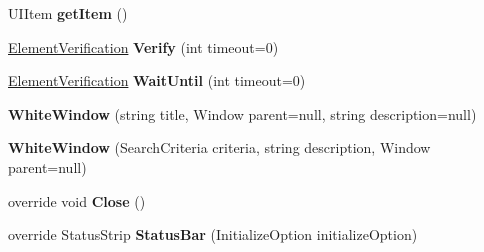 \begin{DoxyCompactItemize}
\item 
\hypertarget{class_proto_test_1_1_golem_1_1_white_1_1_elements_1_1_white_window_a6c56fbf53c3268df54c38743e98be267}{U\-I\-Item {\bfseries get\-Item} ()}\label{class_proto_test_1_1_golem_1_1_white_1_1_elements_1_1_white_window_a6c56fbf53c3268df54c38743e98be267}

\item 
\hypertarget{class_proto_test_1_1_golem_1_1_white_1_1_elements_1_1_white_window_a991aee8890ecb548549f3bc725857854}{\hyperlink{class_proto_test_1_1_golem_1_1_white_1_1_element_verification}{Element\-Verification} {\bfseries Verify} (int timeout=0)}\label{class_proto_test_1_1_golem_1_1_white_1_1_elements_1_1_white_window_a991aee8890ecb548549f3bc725857854}

\item 
\hypertarget{class_proto_test_1_1_golem_1_1_white_1_1_elements_1_1_white_window_a76a90cb735b1012a859a599ce86ca219}{\hyperlink{class_proto_test_1_1_golem_1_1_white_1_1_element_verification}{Element\-Verification} {\bfseries Wait\-Until} (int timeout=0)}\label{class_proto_test_1_1_golem_1_1_white_1_1_elements_1_1_white_window_a76a90cb735b1012a859a599ce86ca219}

\item 
\hypertarget{class_proto_test_1_1_golem_1_1_white_1_1_elements_1_1_white_window_aa6aaa3b841653942b2370c9cfd60b432}{{\bfseries White\-Window} (string title, Window parent=null, string description=null)}\label{class_proto_test_1_1_golem_1_1_white_1_1_elements_1_1_white_window_aa6aaa3b841653942b2370c9cfd60b432}

\item 
\hypertarget{class_proto_test_1_1_golem_1_1_white_1_1_elements_1_1_white_window_ae9b03f587db9d19146926dabe256836b}{{\bfseries White\-Window} (Search\-Criteria criteria, string description, Window parent=null)}\label{class_proto_test_1_1_golem_1_1_white_1_1_elements_1_1_white_window_ae9b03f587db9d19146926dabe256836b}

\item 
\hypertarget{class_proto_test_1_1_golem_1_1_white_1_1_elements_1_1_white_window_ab0fc2b2f5202e352b5e010a53bb63066}{override void {\bfseries Close} ()}\label{class_proto_test_1_1_golem_1_1_white_1_1_elements_1_1_white_window_ab0fc2b2f5202e352b5e010a53bb63066}

\item 
\hypertarget{class_proto_test_1_1_golem_1_1_white_1_1_elements_1_1_white_window_afaa8a43e70a4a1f98e0f6227bf59cdd2}{override Status\-Strip {\bfseries Status\-Bar} (Initialize\-Option initialize\-Option)}\label{class_proto_test_1_1_golem_1_1_white_1_1_elements_1_1_white_window_afaa8a43e70a4a1f98e0f6227bf59cdd2}


\end{DoxyCompactItemize}
